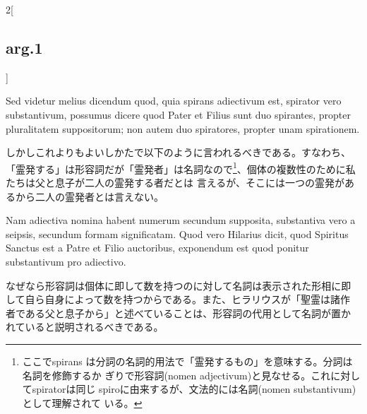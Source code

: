 \documentclass[paper=a4paper,fontsize=10pt,jafontsize=9pt,titlepage]{jlreq}
\begin{document}
\begin{paracol}{2}[\subsection{arg.1}]
\switchcolumn*

Sed videtur melius dicendum quod, quia spirans
adiectivum est, spirator vero substantivum, possumus dicere quod Pater
et Filius sunt duo spirantes, propter pluralitatem suppositorum; non
autem duo spiratores, propter unam spirationem.

\switchcolumn

しかしこれよりもよいしかたで以下のように言われるべきである。すなわち、
「霊発する」は形容詞だが「霊発者」は名詞なので\footnote{ここでspirans
は分詞の名詞的用法で「霊発するもの」を意味する。分詞は名詞を修飾するか
ぎりで形容詞(nomen adjectivum)と見なせる。これに対してspiratorは同じ
spiroに由来するが、文法的には名詞(nomen substantivum)として理解されて
いる。}、個体の複数性のために私たちは父と息子が二人の霊発する者だとは
言えるが、そこには一つの霊発があるから二人の霊発者とは言えない。

\switchcolumn*

Nam adiectiva nomina
habent numerum secundum supposita, substantiva vero a seipsis,
secundum formam significatam. Quod vero Hilarius dicit, quod 
Spiritus Sanctus est a Patre et Filio auctoribus, exponendum est quod
ponitur substantivum pro adiectivo.

\switchcolumn

なぜなら形容詞は個体に即して数を持つのに対して名詞は表示された形相に即
して自ら自身によって数を持つからである。また、ヒラリウスが「聖霊は諸作
者である父と息子から」と述べていることは、形容詞の代用として名詞が置か
 れていると説明されるべきである。

\end{paracol}
\end{document}

